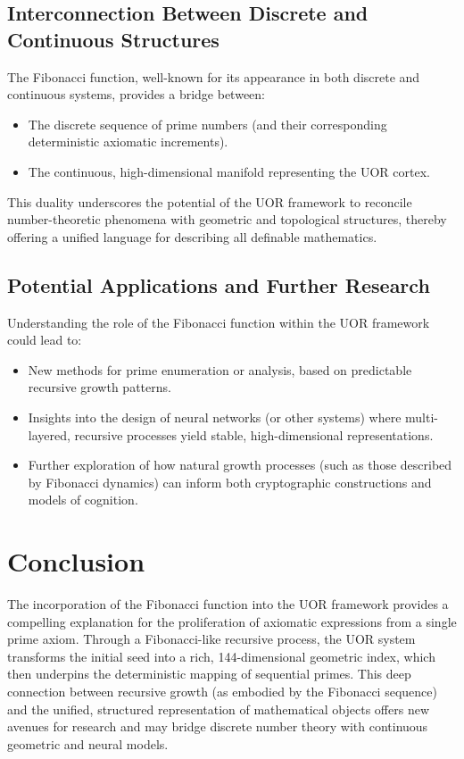 \documentclass[11pt]{article}
\begin{document}
\subsection{Interconnection Between Discrete and Continuous Structures}
The Fibonacci function, well-known for its appearance in both discrete and continuous systems, provides a bridge between:
\begin{itemize}
    \item The discrete sequence of prime numbers (and their corresponding deterministic axiomatic increments).
    \item The continuous, high-dimensional manifold representing the UOR cortex.
\end{itemize}
This duality underscores the potential of the UOR framework to reconcile number-theoretic phenomena with geometric and topological structures, thereby offering a unified language for describing all definable mathematics.

\subsection{Potential Applications and Further Research}
Understanding the role of the Fibonacci function within the UOR framework could lead to:
\begin{itemize}
    \item New methods for prime enumeration or analysis, based on predictable recursive growth patterns.
    \item Insights into the design of neural networks (or other systems) where multi-layered, recursive processes yield stable, high-dimensional representations.
    \item Further exploration of how natural growth processes (such as those described by Fibonacci dynamics) can inform both cryptographic constructions and models of cognition.
\end{itemize}

\section{Conclusion}
The incorporation of the Fibonacci function into the UOR framework provides a compelling explanation for the proliferation of axiomatic expressions from a single prime axiom. Through a Fibonacci-like recursive process, the UOR system transforms the initial seed into a rich, 144-dimensional geometric index, which then underpins the deterministic mapping of sequential primes. This deep connection between recursive growth (as embodied by the Fibonacci sequence) and the unified, structured representation of mathematical objects offers new avenues for research and may bridge discrete number theory with continuous geometric and neural models.
\end{document}
